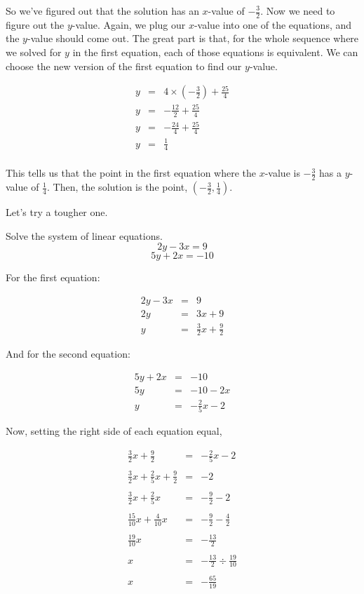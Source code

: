 \begin{example}
So we've figured out that the solution has an $x$-value of $-\frac{3}{2}$.  Now we need to figure out the $y$-value.  Again, we plug our $x$-value into one of the equations, and the $y$-value should come out.  The great part is that, for the whole sequence where we solved for $y$ in the first equation, each of those equations is equivalent.  We can choose the new version of the first equation to find our $y$-value.

$$\begin{array}{rcl}
y & = & 4\times \left(-\frac{3}{2}\right) + \frac{25}{4}\\
y & = & -\frac{12}{2} + \frac{25}{4}\\
y & = & -\frac{24}{4} + \frac{25}{4}\\
y & = & \frac{1}{4}\\
\end{array}$$

This tells us that the point in the first equation where the $x$-value is $-\frac{3}{2}$ has a $y$-value of $\frac{1}{4}$.  Then, the solution is the point, $\left(-\frac{3}{2}, \frac{1}{4}\right)$.
\end{example}

Let's try a tougher one.

\begin{example}
Solve the system of linear equations.
$$2y - 3x = 9$$
$$5y + 2x = -10$$

For the first equation:

$$\begin{array}{rcl}
2y - 3x & = & 9\\
2y & = & 3x + 9\\
y & = & \frac{3}{2}x + \frac{9}{2} \end{array}$$

And for the second equation:

$$\begin{array}{rcl}
5y + 2x & = & -10\\
5y & = & -10 - 2x\\
y & = & -\frac{2}{5}x - 2 \end{array}$$

Now, setting the right side of each equation equal, 

$$\begin{array}{rcl}
\frac{3}{2}x + \frac{9}{2} & = & -\frac{2}{5}x - 2\\ \\
\frac{3}{2}x + \frac{2}{5}x + \frac{9}{2} & = & - 2\\ \\
\frac{3}{2}x + \frac{2}{5}x & = & -\frac{9}{2} - 2\\ \\
\frac{15}{10}x + \frac{4}{10}x & = & -\frac{9}{2} - \frac{4}{2}\\ \\
\frac{19}{10}x & = & -\frac{13}{2}\\ \\
x & = & -\frac{13}{2} \div \frac{19}{10}\\ \\
x & = & -\frac{65}{19} \\
\end{array}$$
\end{example}


